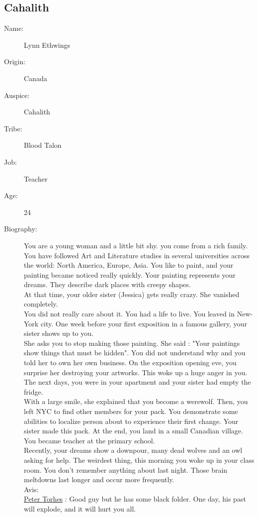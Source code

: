 \documentclass[oneside,12pt]{book}
\begin{document}
\begin{flushleft}
\clearpage
\section{Cahalith}
\begin{description}
\item[Name:]{Lynn Ethwings}
\item[Origin:]{Canada}
\item[Auspice:]{Cahalith}
\item[Tribe:]{Blood Talon}
\item[Job:]{Teacher}
\item[Age:]{24}
\item[Biography:]{ 
 You are a young woman and a little bit shy. you come from a rich family. You have followed Art and Literature studies in several universities across the world: North America, Europe, Asia. 
You like to paint, and your painting became noticed really quickly. Your painting represents your dreams. They describe dark places with creepy shapes.\\ 
At that time, your older sister (Jessica) gets really crazy. She vanished completely.\\
You did not really care about it. You had a life to live. You leaved in New-York city. One week before your first exposition in a famous gallery, your sister shows up to you.\\
She asks you to stop making those painting. She said : "Your paintings show things that must be hidden". You did not understand why and you told her to own her own business. On the exposition opening eve, you surprise her destroying your artworks. This woke up a huge anger in you.
The next days, you were in your apartment and your sister had empty the fridge.\\ 
With a large smile, she explained that you become a werewolf. Then, you left NYC to find other members for your pack.
You demonstrate some abilities to localize person about to experience their first change. 
Your sister made this pack. At the end, you land in a small Canadian village. You became teacher at the primary school.\\
Recently, your dreams show a downpour, many dead wolves and an owl asking for help. 
The weirdest thing, this morning you woke up in your class room. You don't remember anything about last night. 
Those brain meltdowns last longer and occur more frequently. \\
Avis:\\
\underline{Peter Torhes} : Good guy but he has some black folder. One day, his past will explode, and it will hurt you all.\\
}
\end{description}
\end{flushleft}
\end{document}
